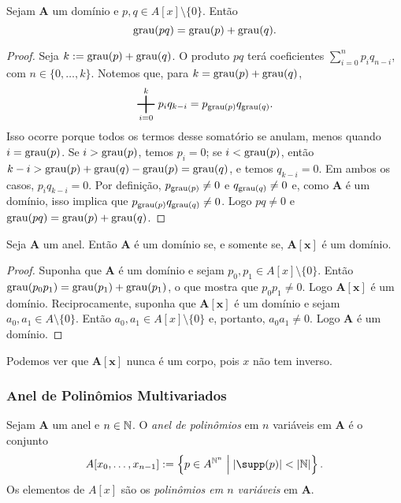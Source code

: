 \begin{prop}
Sejam $\bm A$ um domínio e $p,q \in A[x]\setminus\{0\}$. Então
	\begin{equation*}
	\operatorname{grau}(pq)=\operatorname{grau}(p)+\operatorname{grau}(q).
	\end{equation*}
\end{prop}
\begin{proof}
Seja $k := \operatorname{grau}(p)+\operatorname{grau}(q)$. O produto $pq$ terá coeficientes $\sum_{i=0}^n p_i q_{n-i}$, com $n \in \{0,\ldots,k\}$. Notemos que, para $k = \operatorname{grau}(p)+\operatorname{grau}(q)$,
	\begin{equation*}
	\sum_{i=0}^k p_i q_{k-i} = p_{\g(p)}q_{\g(q)}.
	\end{equation*}
Isso ocorre porque todos os termos desse somatório se anulam, menos quando $i=\operatorname{grau}(p)$. Se $i>\operatorname{grau}(p)$, temos $p_i=0$; se $i<\operatorname{grau}(p)$, então $k-i > \operatorname{grau}(p)+\operatorname{grau}(q)-\operatorname{grau}(p) = \operatorname{grau}(q)$, e temos $q_{k-i}=0$. Em ambos os casos, $p_i q_{k-i}=0$. Por definição, $p_{\operatorname{grau}(p)} \neq 0$ e $q_{\operatorname{grau}(q)} \neq 0$ e, como $\bm A$ é um domínio, isso implica que $p_{\operatorname{grau}(p)} q_{\operatorname{grau}(q)} \neq 0$. Logo $pq \neq 0$ e $\operatorname{grau}(pq)=\operatorname{grau}(p)+\operatorname{grau}(q)$.
\end{proof}

\begin{prop}
Seja $\bm A$ um anel. Então $\bm A$ é um domínio se, e somente se, $\bm{A[x]}$ é um domínio.
\end{prop}
\begin{proof}
Suponha que $\bm A$ é um domínio e sejam $p_0,p_1 \in A[x]\setminus\{0\}$. Então $\operatorname{grau}(p_0p_1)=\operatorname{grau}(p_1)+\operatorname{grau}(p_1)$, o que mostra que $p_0p_1 \neq 0$. Logo $\bm{A[x]}$ é um domínio. Reciprocamente, suponha que $\bm{A[x]}$ é um domínio e sejam $a_0,a_1 \in A\setminus\{0\}$. Então $a_0,a_1 \in A[x]\setminus\{0\}$ e, portanto, $a_0a_1 \neq 0$. Logo $\bm A$ é um domínio.
\end{proof}

Podemos ver que $\bm{A[x]}$ nunca é um corpo, pois $x$ não tem inverso.

\subsubsection{Anel de Polinômios Multivariados}

\begin{defi}
Sejam $\bm A$ um anel e $n \in \mathbb{N}$. O \emph{anel de polinômios} em $n$ variáveis em $\bm A$ é o conjunto
	\begin{equation*}
	A[x_0,\ldots,x_{n-1}] := \set{p \in A^{\N^n}}{\card{\supp(p)} < \card{\N}}.
	\end{equation*}
Os elementos de $A[x]$ são os \emph{polinômios em $n$ variáveis} em $\bm A$.
\end{defi}

